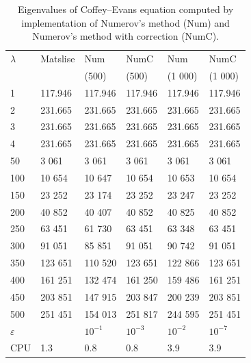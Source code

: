 \documentclass[11pt,a4paper,oneside,openright]{report} %
\begin{document}
\begin{table}[H]
\centering
\caption{Eigenvalues of Coffey--Evans equation computed by implementation of Numerov's method (Num) and Numerov's method with correction (NumC).}
\label{}
{\small
\begin{tabularx}{\textwidth}{l *{5}{X}}
\toprule
$\lambda$ & Matslise & Num  & NumC & Num & NumC  \\
 &  & (500)  & (500) & (1 000) & (1 000) \\
\midrule
1 & 117.946 & 117.946 & 117.946 & 117.946 &  117.946 \\
2 & 231.665 & 231.665 & 231.665 & 231.665 & 231.665 \\
3 & 231.665 & 231.665 & 231.665 & 231.665 &  231.665 \\
4 & 231.665 & 231.665 & 231.665 & 231.665 & 231.665 \\
50 & 3 061 & 3 061 & 3 061 & 3 061 & 3 061 \\
100 & 10 654 & 10 647 & 10 654 & 10 653 & 10 654 \\
150 & 23 252 & 23 174 & 23 252 & 23 247 & 23 252 \\
200 & 40 852 & 40 407 & 40 852 & 40 825 & 40 852 \\
250 & 63 451 & 61 730 & 63 451 & 63 348 &  63 451 \\
300 & 91 051 & 85 851 & 91 051 & 90 742 & 91 051 \\
350 & 123 651 & 110 520 & 123 651 & 122 866 & 123 651 \\
400 & 161 251 & 132 474 & 161 250 & 159 486 & 161 251 \\
450 & 203 851 & 147 915 & 203 847 & 200 239 &  203 851\\
500 & 251 451 & 154 013 & 251 817 & 244 595 & 251 451 \\
\midrule
$\varepsilon$ &  & $10^{-1}$ & $10^{-3}$ & $10^{-2}$ & $10^{-7}$ \\
CPU & 1.3 & 0.8 & 0.8 & 3.9 & 3.9 \\
\bottomrule
\end{tabularx}
}
\end{table}
\end{document}
